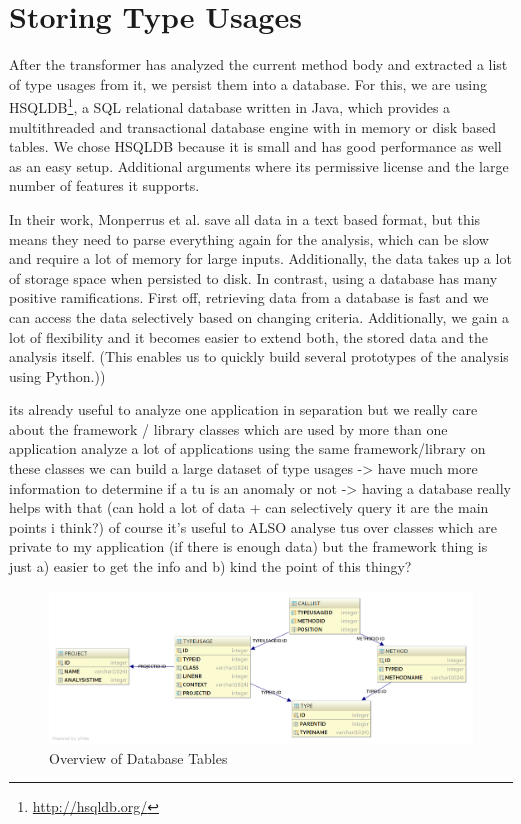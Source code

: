 \section{Storing Type Usages}

After the transformer has analyzed the current method body and extracted a list of type usages from it, we persist them into a database.
For this, we are using HSQLDB\footnote{\url{http://hsqldb.org/}}, a SQL relational database written in Java, which provides a multithreaded and transactional database engine with in memory or disk based tables.
We chose HSQLDB because it is small and has good performance as well as an easy setup.
Additional arguments where its permissive license and the large number of features it supports.

In their work, Monperrus et al. save all data in a text based format, but this means they need to parse everything again for the analysis, which can be slow and require a lot of memory for large inputs.
Additionally, the data takes up a lot of storage space when persisted to disk.
In contrast, using a database has many positive ramifications.
First off, retrieving data from a database is fast and we can access the data selectively based on changing criteria.
Additionally, we gain a lot of flexibility and it becomes easier to extend both, the stored data and the analysis itself.
(This enables us to quickly build several prototypes of the analysis using Python.))

its already useful to analyze one application in separation
but we really care about the framework / library classes which are used by more than one application
analyze a lot of applications using the same framework/library
on these classes we can build a large dataset of type usages -> have much more information to determine if a tu is an anomaly or not
-> having a database really helps with that (can hold a lot of data + can selectively query it are the main points i think?)
of course it's useful to ALSO analyse tus over classes which are private to my application (if there is enough data)
    but the framework thing is just a) easier to get the info and b) kind the point of this thingy?

\begin{figure}[h]
    \centering
    \includegraphics[width=\textwidth]{figures/database_layout-light}
    \caption{Overview of Database Tables}
    \label{fig:db_layout}
\end{figure}

